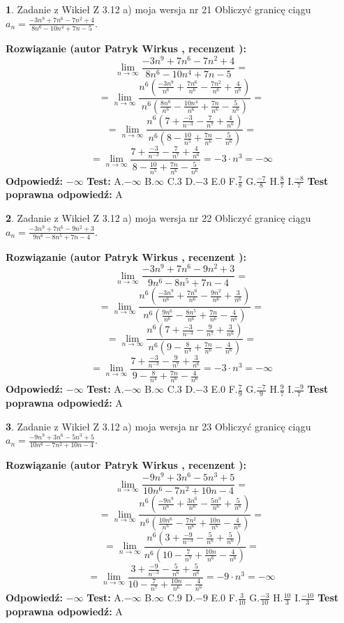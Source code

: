 \documentclass[12pt, a4paper]{article}
\theoremstyle{definition} %
\newtheorem{zad}{}
\newcommand{\zadStart}[1]{\begin{zad}#1\newline}
\newcommand{\zadStop}{\end{zad}}
\newcommand{\rozwStart}[2]{\noindent \textbf{Rozwiązanie (autor #1 , recenzent #2): }\newline}
\newcommand{\rozwStop}{\newline}
\newcommand{\odpStart}{\noindent \textbf{Odpowiedź:}\newline}
\newcommand{\odpStop}{\newline}
\newcommand{\testStart}{\noindent \textbf{Test:}\newline}
\newcommand{\testStop}{\newline}
\newcommand{\kluczStart}{\noindent \textbf{Test poprawna odpowiedź:}\newline}
\newcommand{\kluczStop}{\newline}
\begin{document}
\zadStart{Zadanie z Wikieł Z 3.12 a) moja wersja nr 21}
Obliczyć granicę ciągu $a_{n}=\frac{-3n^{9}+7n^{6}-7n^{2}+4}{8n^{6}-10n^{4}+7n-5}$.
\zadStop
\rozwStart{Patryk Wirkus}{}
$$\lim\limits_{n\to\infty}\frac{-3n^{9}+7n^{6}-7n^{2}+4}{8n^{6}-10n^{4}+7n-5}=$$
$$=\lim\limits_{n\to\infty}\frac{n^{6}\left(\frac{-3n^{9}}{n^{6}}+\frac{7n^{6}}{n^{6}}-\frac{7n^{2}}{n^{6}}+\frac{4}{n^{6}}\right)}{n^{6}\left(\frac{8n^{6}}{n^{6}}-\frac{10n^{4}}{n^{6}}+\frac{7n}{n^{6}}-\frac{5}{n^{6}}\right)}=$$
$$=\lim\limits_{n\to\infty}\frac{n^{6}\left(7+\frac{-3}{n^{-3}}-\frac{7}{n^{7}}+\frac{4}{n^{6}}\right)}
{n^{6}\left(8-\frac{10}{n^{5}}+\frac{7n}{n^{6}}-\frac{5}{n^{6}}\right)}=$$
$$=\lim\limits_{n\to\infty}\frac{7+\frac{-3}{n^{-3}}-\frac{7}{n^{7}}+\frac{4}{n^{6}}}{8-\frac{10}{n^{5}}+\frac{7n}{n^{6}}-\frac{5}{n^{6}}}=-3\cdot n^{3} = -\infty$$
\rozwStop
\odpStart
$-\infty$
\odpStop
\testStart
A.$-\infty$
B.$\infty$
C.$3$
D.$-3$
E.$0$
F.$\frac{7}{8}$
G.$\frac{-7}{8}$
H.$\frac{8}{7}$
I.$\frac{-8}{7}$
\testStop
\kluczStart
A
\kluczStop



\zadStart{Zadanie z Wikieł Z 3.12 a) moja wersja nr 22}
Obliczyć granicę ciągu $a_{n}=\frac{-3n^{9}+7n^{6}-9n^{2}+3}{9n^{6}-8n^{5}+7n-4}$.
\zadStop
\rozwStart{Patryk Wirkus}{}
$$\lim\limits_{n\to\infty}\frac{-3n^{9}+7n^{6}-9n^{2}+3}{9n^{6}-8n^{5}+7n-4}=$$
$$=\lim\limits_{n\to\infty}\frac{n^{6}\left(\frac{-3n^{9}}{n^{6}}+\frac{7n^{6}}{n^{6}}-\frac{9n^{2}}{n^{6}}+\frac{3}{n^{6}}\right)}{n^{6}\left(\frac{9n^{6}}{n^{6}}-\frac{8n^{5}}{n^{6}}+\frac{7n}{n^{6}}-\frac{4}{n^{6}}\right)}=$$
$$=\lim\limits_{n\to\infty}\frac{n^{6}\left(7+\frac{-3}{n^{-3}}-\frac{9}{n^{7}}+\frac{3}{n^{6}}\right)}
{n^{6}\left(9-\frac{8}{n^{4}}+\frac{7n}{n^{6}}-\frac{4}{n^{6}}\right)}=$$
$$=\lim\limits_{n\to\infty}\frac{7+\frac{-3}{n^{-3}}-\frac{9}{n^{7}}+\frac{3}{n^{6}}}{9-\frac{8}{n^{4}}+\frac{7n}{n^{6}}-\frac{4}{n^{6}}}=-3\cdot n^{3} = -\infty$$
\rozwStop
\odpStart
$-\infty$
\odpStop
\testStart
A.$-\infty$
B.$\infty$
C.$3$
D.$-3$
E.$0$
F.$\frac{7}{9}$
G.$\frac{-7}{9}$
H.$\frac{9}{7}$
I.$\frac{-9}{7}$
\testStop
\kluczStart
A
\kluczStop



\zadStart{Zadanie z Wikieł Z 3.12 a) moja wersja nr 23}
Obliczyć granicę ciągu $a_{n}=\frac{-9n^{9}+3n^{6}-5n^{3}+5}{10n^{6}-7n^{2}+10n-4}$.
\zadStop
\rozwStart{Patryk Wirkus}{}
$$\lim\limits_{n\to\infty}\frac{-9n^{9}+3n^{6}-5n^{3}+5}{10n^{6}-7n^{2}+10n-4}=$$
$$=\lim\limits_{n\to\infty}\frac{n^{6}\left(\frac{-9n^{9}}{n^{6}}+\frac{3n^{6}}{n^{6}}-\frac{5n^{3}}{n^{6}}+\frac{5}{n^{6}}\right)}{n^{6}\left(\frac{10n^{6}}{n^{6}}-\frac{7n^{2}}{n^{6}}+\frac{10n}{n^{6}}-\frac{4}{n^{6}}\right)}=$$
$$=\lim\limits_{n\to\infty}\frac{n^{6}\left(3+\frac{-9}{n^{-3}}-\frac{5}{n^{6}}+\frac{5}{n^{6}}\right)}
{n^{6}\left(10-\frac{7}{n^{7}}+\frac{10n}{n^{6}}-\frac{4}{n^{6}}\right)}=$$
$$=\lim\limits_{n\to\infty}\frac{3+\frac{-9}{n^{-3}}-\frac{5}{n^{6}}+\frac{5}{n^{6}}}{10-\frac{7}{n^{7}}+\frac{10n}{n^{6}}-\frac{4}{n^{6}}}=-9\cdot n^{3} = -\infty$$
\rozwStop
\odpStart
$-\infty$
\odpStop
\testStart
A.$-\infty$
B.$\infty$
C.$9$
D.$-9$
E.$0$
F.$\frac{3}{10}$
G.$\frac{-3}{10}$
H.$\frac{10}{3}$
I.$\frac{-10}{3}$
\testStop
\kluczStart
A
\kluczStop
\end{document}
